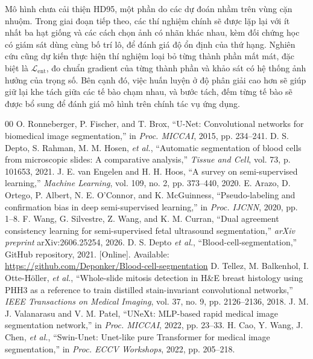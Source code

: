 \documentclass{IEEEtran}
\newcommand{\Lx}[1]{\mathcal{L}_{\mathrm{#1}}}
\begin{document}
Mô hình chưa cải thiện HD95, một phần do các dự đoán nhầm trên vùng cặn nhuộm. Trong giai đoạn tiếp theo, các thí nghiệm chính sẽ được lặp lại với ít nhất ba hạt giống và các cách chọn ảnh có nhãn khác nhau, kèm đối chứng học có giám sát dùng cùng bố trí lô, để đánh giá độ ổn định của thứ hạng. Nghiên cứu cũng dự kiến thực hiện thí nghiệm loại bỏ từng thành phần mất mát, đặc biệt là $\Lx{ent}$, đo chuẩn gradient của từng thành phần và khảo sát có hệ thống ảnh hưởng của trọng số. Bên cạnh đó, việc huấn luyện ở độ phân giải cao hơn sẽ giúp giữ lại khe tách giữa các tế bào chạm nhau, và bước tách, đếm từng tế bào sẽ được bổ sung để đánh giá mô hình trên chính tác vụ ứng dụng.

\begin{thebibliography}{00}
 O. Ronneberger, P. Fischer, and T. Brox, ``U-Net: Convolutional networks for biomedical image segmentation,'' in \textit{Proc. MICCAI}, 2015, pp. 234--241.
 D. S. Depto, S. Rahman, M. M. Hosen, \textit{et al.}, ``Automatic segmentation of blood cells from microscopic slides: A comparative analysis,'' \textit{Tissue and Cell}, vol. 73, p. 101653, 2021.
 J. E. van Engelen and H. H. Hoos, ``A survey on semi-supervised learning,'' \textit{Machine Learning}, vol. 109, no. 2, pp. 373--440, 2020.
 E. Arazo, D. Ortego, P. Albert, N. E. O'Connor, and K. McGuinness, ``Pseudo-labeling and confirmation bias in deep semi-supervised learning,'' in \textit{Proc. IJCNN}, 2020, pp. 1--8.
 F. Wang, G. Silvestre, Z. Wang, and K. M. Curran, ``Dual agreement consistency learning for semi-supervised fetal ultrasound segmentation,'' \textit{arXiv preprint} arXiv:2606.25254, 2026.
 D. S. Depto \textit{et al.}, ``Blood-cell-segmentation,'' GitHub repository, 2021. [Online]. Available: \url{https://github.com/Deponker/Blood-cell-segmentation}
 D. Tellez, M. Balkenhol, I. Otte-H\"{o}ller, \textit{et al.}, ``Whole-slide mitosis detection in H\&E breast histology using PHH3 as a reference to train distilled stain-invariant convolutional networks,'' \textit{IEEE Transactions on Medical Imaging}, vol. 37, no. 9, pp. 2126--2136, 2018.
 J. M. J. Valanarasu and V. M. Patel, ``UNeXt: MLP-based rapid medical image segmentation network,'' in \textit{Proc. MICCAI}, 2022, pp. 23--33.
 H. Cao, Y. Wang, J. Chen, \textit{et al.}, ``Swin-Unet: Unet-like pure Transformer for medical image segmentation,'' in \textit{Proc. ECCV Workshops}, 2022, pp. 205--218.

\end{thebibliography}
\end{document}
